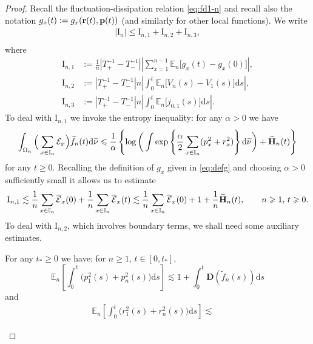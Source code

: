 \documentclass[EJP]{ejpecp} %
\newcommand\al{\alpha}
\newcommand\bbE{{\mathbb E}}
\newcommand\T{{\mathbb I}}
\newcommand\Om{\Omega}
\renewcommand{\ge}{\geqslant}
\renewcommand{\le}{\leqslant}
\newcommand{\dd  }{\mathrm{d}}
\renewcommand{\tilde}{\widetilde}
\renewcommand{\bar}{\overline}
\numberwithin{equation}{section}
\begin{document}
\begin{proof}
Recall the fluctuation-dissipation relation \eqref{eq:fd1-n}
and recall also the notation $g_x(t):=g_x({\bf r}(t),{\bf p}(t))$ (and similarly for other local functions). We  write 
\begin{align*}
|\mathrm{I}_n|\le \mathrm{I}_{n,1}+\mathrm{I}_{n,2}+\mathrm{I}_{n,3}, \\
\end{align*}
where
\begin{align}
\mathrm{I}_{n,1}&:= \frac{1}{n}\left|T_+^{-1} - T_-^{-1}\right| \left|\sum_{x=1}^{n-1}
  \bbE_n\Big[ g_x(t)-g_x(0)\Big]\right|,\label{In1}\\
\mathrm{I}_{n,2}&:= \left|T_+^{-1} - T_-^{-1}\right| n\left|\int_0^t
  \bbE_n\Big[ V_n(s)-V_1(s)\Big]\dd s\right|,\label{In2}\\
\mathrm{I}_{n,3}&:=\left|T_+^{-1} - T_-^{-1}\right| n\left|\int_0^t
  \bbE_n\Big[ j_{0,1}(s)\Big]\dd s\right|.\label{In3}
\end{align}
 To deal with $\mathrm{I}_{n,1}$ we invoke   the entropy inequality: 
for any $\al>0$ we have
\begin{equation}
\label{entropy-in-t}
\int_{\Om_n}  \Big(\sum_{x\in\T_n}{\cal E}_x\Big) \tilde f_n(t) \dd
 \tilde\nu
\le \frac{1}{\al}\left\{\log\bigg(\int
     \exp\left\{ \frac\al 2 \sum_{x\in\T_n}(p_x^2+r_x^2)
     \right\}\dd\tilde \nu \bigg)+\tilde{\mathbf{H}}_{n}(t)\right\}
  \end{equation}
for any $t\ge0$. Recalling the definition of $g_x$ given in \eqref{eq:defg} and choosing $\al>0$ sufficiently small
it allows us to estimate
\begin{equation*}
\mathrm{I}_{n,1}  \lesssim \frac{1}{n}\sum_{x\in \T_n}\bar{\cal E}_x(0)+
  \frac{1}{n}\sum_{x\in \T_n}\bar{\cal E}_x(t) \lesssim \frac{1}{n}\sum_{x\in \T_n}\bar{\cal
  E}_x(0)+1+\frac{1}{n}\tilde{\mathbf{H}}_n(t),\qquad n\ge 1,\,t\ge0.
\end{equation*}
To deal with $\mathrm{I}_{n,2}$, which involves boundary terms, we shall need some auxiliary 
estimates.
\begin{lemma}
\label{lm011401-20}
For any $t_*\ge0$ we have: for $ n\ge 1,\,t\in[0,t_*]$,
  \begin{equation}\label{eq:rn-21xx}
  \mathbb{E}_n\left[ \int_0^t\big(p_1^2(s)+ p_n^2(s)\big)\dd s\right]  \lesssim
1+\int_0^t \mathbf D(\tilde
f_n(s))\dd s
\end{equation} 
and
\begin{align}\label{eq:rn-21x}
  \mathbb{E}_n\left[ \int_0^t \big(r_1^2(s)  +r_n^2(s)\big) \dd s\right]    \lesssim & \;

\end{align}
\end{lemma}
\end{proof}
\end{document}
